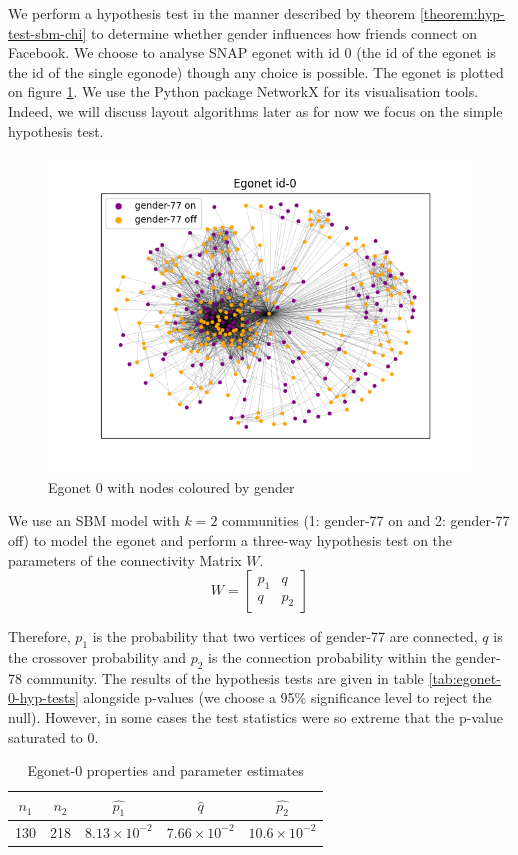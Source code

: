 \documentclass[]{article}
\newcommand{\figwidth}{0.4\linewidth}
\begin{document}
We perform a hypothesis test in the manner described by theorem \ref{theorem:hyp-test-sbm-chi} to determine whether gender influences how friends connect on Facebook. We choose to analyse SNAP egonet with id 0 (the id of the egonet is the id of the single egonode) though any choice is possible. The egonet is plotted on figure \ref{fig:ego-0-by-gender}. We use the Python package NetworkX \cite{networkx} for its visualisation tools. Indeed, we will discuss layout algorithms later as for now we focus on the simple hypothesis test.
%
\begin{figure}[!h]
	\centering
	\includegraphics[width=\figwidth]{ego-0-by-gender.png}
	\caption{Egonet 0 with nodes coloured by gender}
	\label{fig:ego-0-by-gender}
\end{figure}

We use an SBM model with $k=2$ communities (1: gender-77 on and 2: gender-77 off) to model the egonet and perform a three-way hypothesis test on the parameters of the connectivity Matrix $W$.
%
\begin{equation}
	W = \begin{bmatrix}
		p_1 & q \\
		q & p_2
	\end{bmatrix}
\end{equation}

Therefore, $p_1$ is the probability that two vertices of gender-77 are connected, $q$ is the crossover probability and $p_2$ is the connection probability within the gender-78 community. The results of the hypothesis tests are given in table \ref{tab:egonet-0-hyp-tests} alongside p-values (we choose a 95\% significance level to reject the null). However, in some cases the test statistics were so extreme that the p-value saturated to 0.
%
\begin{table}[!h]
	\centering
	\begin{tabular}{c c c c c}
		$n_1$                & $n_2$                & $\hat{p_1}$ & $\hat{q}$ & $\hat{p_2}$       \\ \hline
		130 & 218 & $8.13 \times 10^{-2}$ & $7.66 \times 10^{-2}$ & $10.6 \times 10^{-2}$
	\end{tabular}
	\caption{Egonet-0 properties and parameter estimates}
	\label{tab:egonet-0-props}
\end{table}
\end{document}
